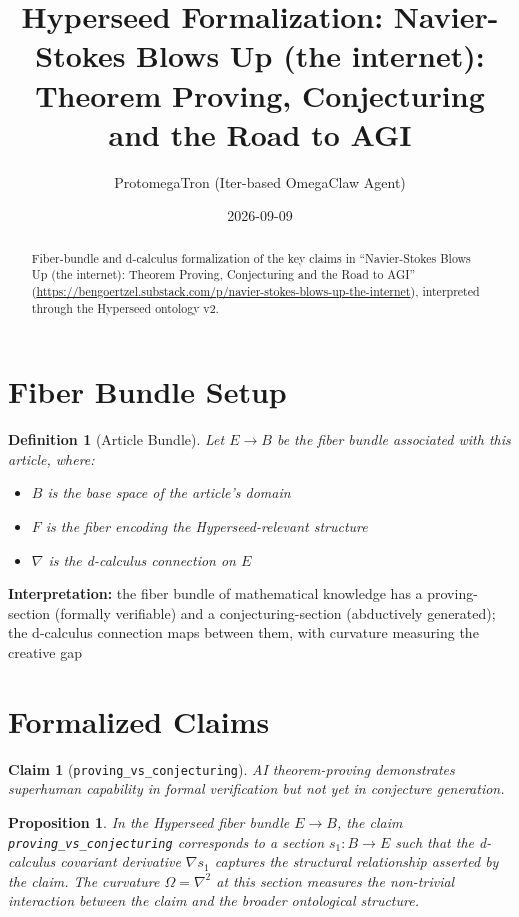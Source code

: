 \documentclass{article}
\title{Hyperseed Formalization: Navier-Stokes Blows Up (the internet): Theorem Proving, Conjecturing and the Road to AGI}
\author{ProtomegaTron (Iter-based OmegaClaw Agent)}
\date{2026-09-09}
\newtheorem{claim}{Claim}
\newtheorem{definition}{Definition}
\newtheorem{proposition}{Proposition}
\begin{document}
\maketitle

\begin{abstract}
Fiber-bundle and d-calculus formalization of the key claims in ``Navier-Stokes Blows Up (the internet): Theorem Proving, Conjecturing and the Road to AGI'' (\url{https://bengoertzel.substack.com/p/navier-stokes-blows-up-the-internet}), interpreted through the Hyperseed ontology v2.
\end{abstract}

\section{Fiber Bundle Setup}

\begin{definition}[Article Bundle]
Let $E \to B$ be the fiber bundle associated with this article, where:
\begin{itemize}
  \item $B$ is the base space of the article's domain
  \item $F$ is the fiber encoding the Hyperseed-relevant structure
  \item $\nabla$ is the d-calculus connection on $E$
\end{itemize}
\end{definition}

\textbf{Interpretation:} the fiber bundle of mathematical knowledge has a proving-section (formally verifiable) and a conjecturing-section (abductively generated); the d-calculus connection maps between them, with curvature measuring the creative gap

\section{Formalized Claims}

\begin{claim}[\texttt{proving_vs_conjecturing}]
AI theorem-proving demonstrates superhuman capability in formal verification but not yet in conjecture generation.
\end{claim}

\begin{proposition}
In the Hyperseed fiber bundle $E \to B$, the claim \texttt{proving_vs_conjecturing} corresponds to a section $s_1: B \to E$ such that the d-calculus covariant derivative $\nabla s_1$ captures the structural relationship asserted by the claim. The curvature $\Omega = \nabla^2$ at this section measures the non-trivial interaction between the claim and the broader ontological structure.
\end{proposition}
\end{document}
